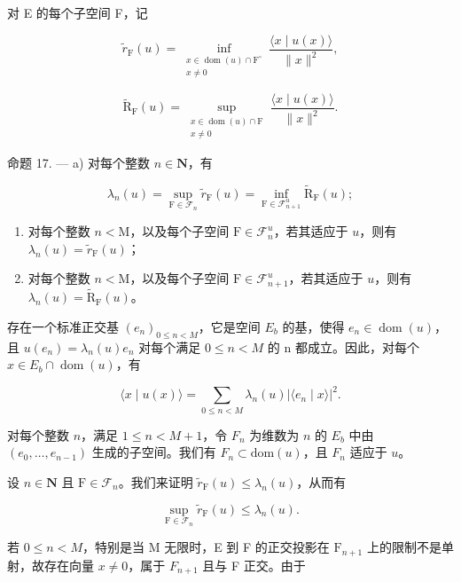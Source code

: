 对 E 的每个子空间 F，记

\[
\widetilde{r}_{\mathrm{F}}(u) = \inf_{\substack{x\in \operatorname{dom}(u)\cap \mathrm{F}^{\circ}\\ x\neq 0}}\frac{\langle x\mid u(x)\rangle}{\|x\|^{2}},
\]

\[
\widetilde{\mathrm{R}}_{\mathrm{F}}(u) = \sup_{\substack{x\in \operatorname{dom}(u)\cap \mathrm{F}\\ x\neq 0}}\frac{\langle x\mid u(x)\rangle}{\|x\|^ {2}}.
\]

命题 17. --- a) 对每个整数 \(n \in \mathbf{N}\)，有

\[
\lambda_ {n} (u) = \sup _ {\mathrm{F} \in \mathcal {F} _ {n}} \widetilde {r} _ {\mathrm{F}} (u) = \inf _ {\mathrm{F} \in \mathcal {F} _ {n + 1} ^ {u}} \widetilde {\mathrm{R}} _ {\mathrm{F}} (u);
\]

\begin{enumerate}
\def\labelenumi{\alph{enumi})}
\setcounter{enumi}{1}
\item
  对每个整数 \(n < \mathrm{M}\)，以及每个子空间 \(\mathrm{F} \in \mathcal{F}_n^u\)，若其适应于 \(u\)，则有 \(\lambda_n(u) = \widetilde{r}_{\mathrm{F}}(u)\)；
\item
  对每个整数 \(n < \mathrm{M}\)，以及每个子空间 \(\mathrm{F} \in \mathcal{F}_{n+1}^{u}\)，若其适应于 \(u\)，则有 \(\lambda_{n}(u) = \widetilde{\mathrm{R}}_{\mathrm{F}}(u)\)。
\end{enumerate}

存在一个标准正交基 \((e_{n})_{0\leqslant n<M}\)，它是空间 \(E_{b}\) 的基，使得 \(e_{n}\in\operatorname{dom}(u)\)，且 \(u(e_{n})=\lambda_{n}(u)e_{n}\) 对每个满足 \(0\leqslant n<M\) 的 n 都成立。因此，对每个 \(x\in E_{b}\cap\operatorname{dom}(u)\)，有

\[
\langle x \mid u (x) \rangle = \sum_ {0 \leqslant n <   M} \lambda_ {n} (u) | \langle e _ {n} \mid x \rangle | ^ {2}.
\]

 对每个整数 \(n\)，满足 \(1 \leqslant n < M + 1\)，令 \(F_n\) 为维数为 \(n\) 的 \(E_b\) 中由 \((e_0, \ldots, e_{n-1})\) 生成的子空间。我们有 \(F_n \subset \text{dom}(u)\)，且 \(F_n\) 适应于 \(u\)。

设 \(n \in \mathbf{N}\) 且 \(\mathrm{F} \in \mathcal{F}_n\)。我们来证明 \(\widetilde{r}_{\mathrm{F}}(u) \leqslant \lambda_n(u)\)，从而有

\[
\sup _ {\mathrm{F} \in \mathcal {F} _ {n}} \widetilde {r} _ {\mathrm{F}} (u) \leqslant \lambda_ {n} (u).\tag{19}
\]

若 \(0 \leqslant n < M\)，特别是当 M 无限时，E 到 F 的正交投影在 \(\mathrm{F}_{n+1}\) 上的限制不是单射，故存在向量 \(x \neq 0\)，属于 \(F_{n+1}\) 且与 F 正交。由于

